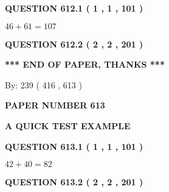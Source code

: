 \documentclass[12pt]{article}
\begin{document}
{\textbf{\Large{QUESTION
612.1 
 ( 1 , 1 , 101 )
}}}
  
  
 
 

$ %
46 +  %
61=   %
107$
 
 
  
\vspace{0.2in}
  
{\textbf{\Large{QUESTION
612.2 
 ( 2 , 2 , 201 )
}}}
  
  
   
   
 \vspace{0.2in}
 
   
   
   
   
\vspace{1.0in} 
{\textbf{\large{ *** END OF PAPER, THANKS *** }}} 
   
   
\hspace{1.0in} By: 
 239 ( 416 ,  613 )
   
   
   
   
\newpage 
\setcounter{page}{ 
   613001 } 
   
   
   
   
 {\textbf{ \Large{ PAPER NUMBER  613  }}}
   
   
\vspace{0.2in}
   
   
   
   
   
   
 \vspace{0.2in}
{\LARGE {\textbf{ A QUICK TEST EXAMPLE}}}
   
   
  
\vspace{0.2in}
  
{\textbf{\Large{QUESTION
613.1 
 ( 1 , 1 , 101 )
}}}
  
  
 
 

$ %
42 +  %
40=   %
82$
 
 
  
\vspace{0.2in}
  
{\textbf{\Large{QUESTION
613.2 
 ( 2 , 2 , 201 )
}}}
  
  
   
   
 \vspace{0.2in}
 
   
   
\end{document}
